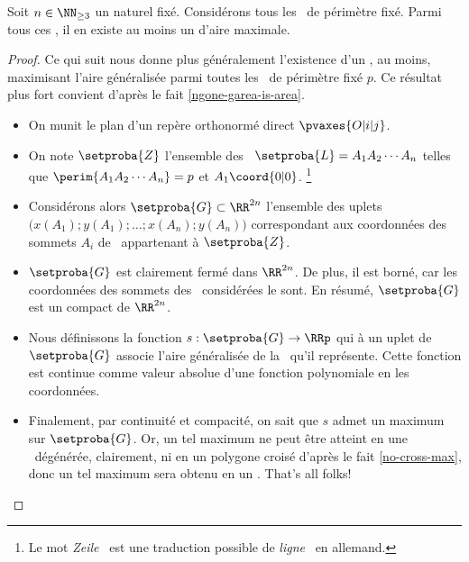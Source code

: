 

\begin{fact} \label{suff-cond}
    Soit $n \in \NN_{\geq3}$ un naturel fixé.
    Considérons tous les \ngones\ de périmètre fixé. Parmi tous ces \ngones, il en existe au moins un d'aire maximale.
\end{fact}


\begin{proof}
	Ce qui suit nous donne plus généralement l'existence d'un \ngone, au moins, maximisant l'aire généralisée parmi toutes les \nlines\ de périmètre fixé $p$. Ce résultat plus fort convient d'après le fait \ref{ngone-garea-is-area}.
    \begin{itemize}
        \item On munit le plan d'un repère orthonormé direct $\pvaxes{O | i | j}$. 


        \item On note $\setproba{Z}$ l'ensemble des \nlines\ $\setproba{L} = A_1 A_2 \cdots A_n$ telles que
        $\perim{A_1 A_2 \cdots A_n} = p$
        et
        $A_1\coord{0 | 0}$.%
        \footnote{
        	Le mot \og \emph{Zeile} \fg\ est une traduction possible de \og \emph{ligne} \fg\ en allemand.
        }


        \item Considérons alors $\setproba{G} \subset \RR^{2n}$ l'ensemble des uplets $\big( x(A_1) ; y(A_1) ; \dots ; x(A_n) ; y(A_n) \big)$ correspondant aux coordonnées des sommets $A_i$ de \nlines\ appartenant à $\setproba{Z}$.
        
        
        \item $\setproba{G}$ est clairement fermé dans $\RR^{2n}$.
        De plus, il est borné, car les coordonnées des sommets des \nlines\ considérées le sont.        
        En résumé, $\setproba{G}$ est un compact de $\RR^{2n}$.


        \item Nous définissons la fonction $s: \setproba{G} \rightarrow \RRp$ qui à un uplet de $\setproba{G}$ associe l'aire généralisée de la \nline\ qu'il représente. 
        Cette fonction est continue comme valeur absolue d'une fonction polynomiale en les coordonnées.
       
        
        \item Finalement, par continuité et compacité, on sait que $s$ admet un maximum sur $\setproba{G}$.
        Or, un tel maximum ne peut être atteint en une \nline\ dégénérée, clairement, ni en un polygone croisé d'après le fait \ref{no-cross-max}, donc un tel maximum sera obtenu en un \ngone. That's all folks!
    \end{itemize}    
\end{proof}


